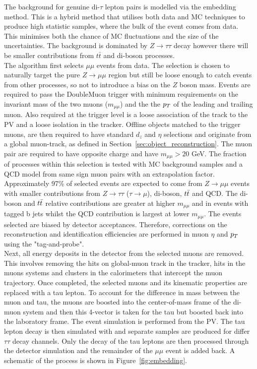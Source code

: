 The background for genuine di-$\tau$ lepton pairs is modelled via the embedding method. 
This is a hybrid method that utilises both data and MC techniques to produce high statistic samples, where the bulk of the event comes from data.
This minimises both the chance of MC fluctuations and the size of the uncertainties.
The background is dominated by $Z \rightarrow \tau \tau$ decay however there will be smaller contributions from $t\bar{t}$ and di-boson processes.  \\

The algorithm first selects $\mu\mu$ events from data.
The selection is chosen to naturally target the pure $Z \rightarrow \mu\mu$ region but still be loose enough to catch events from other processes, so not to introduce a bias on the $Z$ boson mass.
Events are required to pass the DoubleMuon trigger with minimum requirements on the invariant mass of the two muons ($m_{\mu\mu}$) and the the $p_{T}$ of the leading and trailing muon.
Also required at the trigger level is a loose association of the track to the PV and a loose isolation in the tracker.
Offline objects matched to the trigger muons, are then required to have standard $d_z$ and $\eta$ selections and originate from a global muon-track, as defined in Section~\ref{sec:object_reconstruction}.
The muon pair are required to have opposite charge and have $m_{\mu\mu} > 20$ GeV.
The fraction of processes within this selection is tested with MC background samples and a QCD model from same sign muon pairs with an extrapolation factor.
Approximately 97\% of selected events are expected to come from $Z\rightarrow \mu\mu$ events with smaller contributions from $Z \rightarrow \tau\tau$ ($\tau\rightarrow\mu$), di-boson, $t\bar{t}$ and QCD.
The di-boson and $t\bar{t}$ relative contributions are greater at higher $m_{\mu\mu}$ and in events with tagged b jets whilst the QCD contribution is largest at lower $m_{\mu\mu}$.
The events selected are biased by detector acceptances. 
Therefore, corrections on the reconstruction and identification efficiencies are performed in muon $\eta$ and $p_{T}$ using the "tag-and-probe". \\

Next, all energy deposits in the detector from the selected muons are removed.
This involves removing the hits on global-muon track in the tracker, hits in the muons systems and clusters in the calorimeters that intercept the muon trajectory.
Once completed, the selected muons and its kinematic properties are replaced with a tau lepton.
To account for the difference in mass between the muon and tau, the muons are boosted into the center-of-mass frame of the di-muon system and then this 4-vector is taken for the tau but boosted back into the laboratory frame.
The event simulation is performed from the PV.
The tau lepton decay is then simulated with \PYTHIA and separate samples are produced for differ $\tau\tau$ decay channels.
Only the decay of the tau leptons are then processed through the detector simulation and the remainder of the $\mu\mu$ event is added back.
A schematic of the process is shown in Figure~\ref{fig:embedding}. \\

